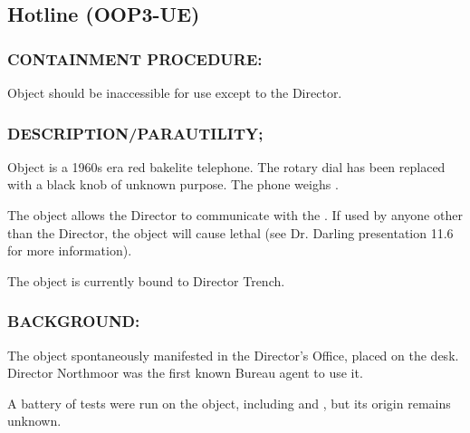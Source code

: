 \subsection*{Hotline (OOP3-UE)}
\subsubsection*{CONTAINMENT PROCEDURE:}
Object should be inaccessible for use
except to the Director.
\subsubsection*{DESCRIPTION/PARAUTILITY;}
Object is a 1960s era red bakelite
telephone. The rotary dial has been
replaced with a black knob of unknown
purpose. The phone weighs .
\par The object allows the Director to communicate with the . If
used by anyone other than the Director, the object will cause lethal
 (see Dr. Darling presentation
11.6 for more information).

\par The object is currently bound to Director Trench.
\subsubsection*{BACKGROUND:}
\par The object spontaneously manifested in the Director's Office,
placed on the desk. Director Northmoor was the first known
Bureau agent to use it.
\par A battery of tests were run on the object, including  and , but its origin remains unknown.